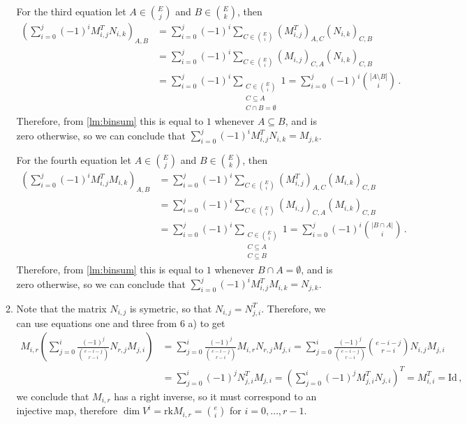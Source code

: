 \documentclass[kulak]{tplt}
\theoremstyle{definition}
\newcommand{\rk}{\mathrm{rk}}
\newcommand{\Id}{\mathrm{Id}}
\begin{document}
\begin{enumerate}
\begin{enumerate}
For the third equation let $A \in \binom{E}{j}$ and $B \in \binom{E}{k}$, then
\begin{align*}
\left(\sum_{i=0}^j (-1)^i M_{i, j}^T N_{i, k}\right)_{A, B} &= \sum_{i=0}^j (-1)^i \sum_{C \in \binom{E}{i}} (M_{i, j}^T)_{A, C}( N_{i, k})_{C, B}\\
&=\sum_{i=0}^j (-1)^i \sum_{C \in \binom{E}{i}} (M_{i, j})_{C, A}( N_{i, k})_{C, B}\\
&=\sum_{i=0}^j (-1)^i \sum_{\substack{C \in \binom{E}{i}\\ C \subseteq A \\ C \cap B = \emptyset  }} 1 =\sum_{i=0}^j (-1)^i \binom{|A \setminus B|}{i}\, . 
\end{align*}
Therefore, from \cref{lm:binsum} this is equal to $1$ whenever $A \subseteq B $, and is zero otherwise, so we can conclude that
$\sum_{i=0}^j (-1)^i M_{i, j}^T N_{i, k} = M_{j, k}$.


For the fourth equation let $A \in \binom{E}{j}$ and $B \in \binom{E}{k}$, then
\begin{align*}
\left(\sum_{i=0}^j (-1)^i M_{i, j}^T M_{i, k}\right)_{A, B} &= \sum_{i=0}^j (-1)^i \sum_{C \in \binom{E}{i}} (M_{i, j}^T)_{A, C}( M_{i, k})_{C, B}\\
&=\sum_{i=0}^j (-1)^i \sum_{C \in \binom{E}{i}} (M_{i, j})_{C, A}( M_{i, k})_{C, B}\\
&=\sum_{i=0}^j (-1)^i \sum_{\substack{C \in \binom{E}{i}\\ C \subseteq A \\ C\subseteq B}} 1 =\sum_{i=0}^j (-1)^i \binom{|B \cap A|}{i}\, . 
\end{align*}
Therefore, from \cref{lm:binsum} this is equal to $1$ whenever $B \cap A = \emptyset $, and is zero otherwise, so we can conclude that
$\sum_{i=0}^j (-1)^i  M_{i, j}^T M_{i, k} = N_{j, k}$.




\item 
Note that the matrix $N_{i, j}$ is symetric, so that $N_{i, j} = N_{j, i}^T$.
Therefore, we can use equations one and three from 6 a) to get
\begin{align*}
M_{i, r} \left( \sum_{j=0}^i \frac{(-1)^j}{\binom{e-i-j}{r-i}} N_{r, j} M_{j, i}\right) &= \sum_{j=0}^i \frac{(-1)^j}{\binom{e-i-j}{r-i}}M_{i, r} N_{r, j} M_{j, i} = \sum_{j=0}^i \frac{(-1)^j}{\binom{e-i-j}{r-i}}\binom{e-i-j}{r-i} N_{i, j} M_{j, i}\\
&= \sum_{j=0}^i (-1)^j N_{j, i}^T M_{j, i} = \left(\sum_{j=0}^i (-1)^j M_{j, i}^T N_{j, i} \right)^T = M_{i, i}^T = \Id \, ,
\end{align*}
we conclude that $M_{i, r}$ has a right inverse, so it must correspond to an injective map, therefore $\dim V^i = \rk M_{i, r} = \binom{e}{i}$ for $i = 0 , \ldots, r-1$.


\end{enumerate}
\end{enumerate}
\end{document}
